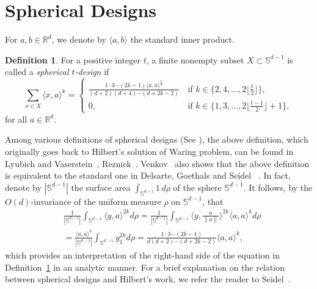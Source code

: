 \documentclass[11pt]{amsart}
\theoremstyle{definition}
\newtheorem{dfn}[thm]{Definition}
\newcommand{\R}{\mathbb{R}}
\begin{document}
\section{Spherical Designs}\label{sec:4}

For \( a,b\in\R^d \), we denote by \( \langle a,b\rangle \) the standard inner product.

\begin{dfn}
\label{def:spht-design}
For a positive integer \( t \), a finite nonempty subset \( X\subset\mathbb{S}^{d-1} \) is called a \emph{spherical \( t \)-design} if
\[
\sum_{x\in X} \langle x,a\rangle^k =
\begin{cases}
\displaystyle \frac{1\cdot3\cdots(2k-1) \langle a,a\rangle^{\frac{k}{2}} }{(d+2)(d+4)\cdots(d+2k-2) }\, & \text{if } k\in\{2,4,\ldots, 2 \lfloor \frac{t}{2} \rfloor \},\\[2mm]
0, & \text{if } k\in\{1,3,\ldots,2 \lfloor \frac{t-1}{2} \rfloor+1 \},
\end{cases}
\]
for all \( a\in\R^d \).
\end{dfn}

Among various definitions of spherical designs
(See \cite[Theorem 2.2]{MR2535394}),
the above definition, which originally goes back to Hilbert's solution of Waring problem, can be found in Lyubich and Vaserstein~\cite{MR1235223}, Reznick~\cite{MR1096187}.
Venkov~\cite[Section 3]{MR1881618} also shows that the above definition is equivalent to the standard one in Delsarte, Goethals and Seidel ~\cite{MR485471}.
In fact, denote by $|\mathbb{S}^{d-1}|$ the surface area $\int_{\mathbb{S}^{d-1}}1\,d\rho$
of the sphere $\mathbb{S}^{d-1}$.
It follows, by the $O(d)$-invariance of the uniform measure $\rho$ on $\mathbb{S}^{d-1}$, that
\begin{align*}
&\frac{1}{|\mathbb{S}^{d-1}|} \int_{\mathbb{S}^{d-1}} \langle y,a \rangle^{2k} d\rho
=
\frac{1}{|\mathbb{S}^{d-1}|} \int_{\mathbb{S}^{d-1}} \langle y,\frac{a}{\|a\|} \rangle^{2k} \langle a,a \rangle^k d\rho
\\
&=
\frac{\langle a,a \rangle^k}{|\mathbb{S}^{d-1}|} \int_{\mathbb{S}^{d-1}} y_1^{2k} d\rho 
=
\frac{1 \cdot 3 \cdots (2k-1)}{d(d+2)\cdots(d+2k-2)} \langle a,a \rangle^k,
\end{align*}
which provides an interpretation of the right-hand side of the equation in 
Definition~\ref{def:spht-design} in an analytic manner. 
For a brief explanation on the relation between spherical designs and Hilbert's work, we refer the reader to Seidel~\cite{MR1313290}.
\end{document}
